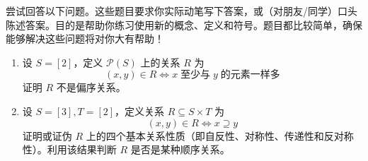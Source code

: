 尝试回答以下问题。这些题目要求你实际动笔写下答案，或（对朋友/同学）口头陈述答案。目的是帮助你练习使用新的概念、定义和符号。题目都比较简单，确保能够解决这些问题将对你大有帮助！

\begin{enumerate}[label=(\arabic*)]
    \item 设 $S=[2]$，定义 $\mathcal{P}(S)$ 上的关系 $R$ 为 
    \[(x, y) \in R \iff x \;\text{至少与}\; y \;\text{的元素一样多}\]
    证明 $R$ 不是偏序关系。
    \item 设 $S=[3], T=[2]$，定义关系 $R \subseteq S \times T$ 为
    \[(x, y) \in R \iff x \supseteq y\]
    证明或证伪 $R$ 上的四个基本关系性质（即自反性、对称性、传递性和反对称性）。利用该结果判断 $R$ 是否是某种顺序关系。
\end{enumerate}